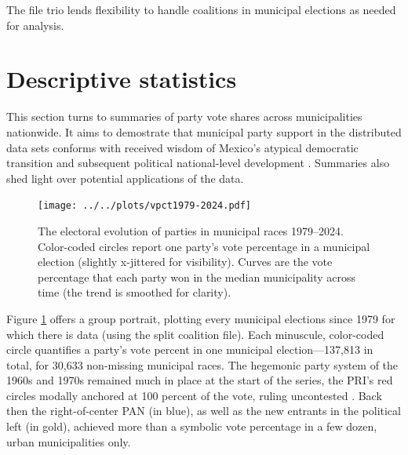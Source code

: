 \documentclass[letter,12pt]{article}
\begin{document}
The file trio lends flexibility to handle coalitions in municipal elections as needed for analysis. %


\section{Descriptive statistics}

This section turns to summaries of party vote shares across municipalities nationwide. It aims to demostrate that municipal party support in the distributed data sets conforms with received wisdom of Mexico's atypical democratic transition \citep[eg.][]{cornelius.1996} and subsequent political national-level development \citep[eg.][]{diaz-estevez-magaloni-Poverty-book.2016}. Summaries also shed light over potential applications of the data. 

\begin{figure}
  \texttt{[image: ../../plots/vpct1979-2024.pdf]}
  \caption{The electoral evolution of parties in municipal races 1979--2024. Color-coded circles report one party's vote percentage in a municipal election (slightly x-jittered for visibility). Curves are the vote percentage that each party won in the median municipality across time (the trend is smoothed for clarity).}\label{F:vpcts}
\end{figure}  

Figure \ref{F:vpcts} offers a group portrait, plotting every municipal elections since 1979 for which there is data (using the split coalition file). Each minuscule, color-coded circle quantifies a party's vote percent in one municipal election---137,813 in total, for 30,633 non-missing municipal races. The hegemonic party system of the 1960s and 1970s remained much in place at the start of the series, the PRI's red circles modally anchored at 100 percent of the vote, ruling uncontested \citep{segovia.els1979}. Back then the right-of-center PAN (in blue), as well as the new entrants in the political left (in gold), achieved more than a symbolic vote percentage in a few dozen, urban municipalities only.
\end{document}
